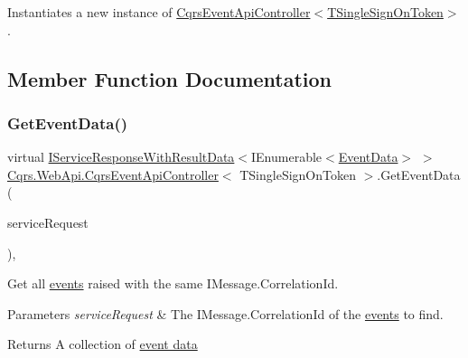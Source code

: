 Instantiates a new instance of \hyperlink{classCqrs_1_1WebApi_1_1CqrsEventApiController_a5f1162d692213363fdcaf898f439f7dd_a5f1162d692213363fdcaf898f439f7dd}{Cqrs\+Event\+Api\+Controller$<$\+T\+Single\+Sign\+On\+Token$>$}. 



\subsection{Member Function Documentation}
\mbox{\label{classCqrs_1_1WebApi_1_1CqrsEventApiController_aac0079ced115761a0ab605eaebe0801b_aac0079ced115761a0ab605eaebe0801b}} 
\subsubsection{\texorpdfstring{Get\+Event\+Data()}{GetEventData()}}
{\footnotesize\ttfamily virtual \hyperlink{interfaceCqrs_1_1Services_1_1IServiceResponseWithResultData}{I\+Service\+Response\+With\+Result\+Data}$<$I\+Enumerable$<$\hyperlink{classCqrs_1_1Events_1_1EventData}{Event\+Data}$>$ $>$ \hyperlink{classCqrs_1_1WebApi_1_1CqrsEventApiController}{Cqrs.\+Web\+Api.\+Cqrs\+Event\+Api\+Controller}$<$ T\+Single\+Sign\+On\+Token $>$.Get\+Event\+Data (\begin{DoxyParamCaption}\item[{\hyperlink{interfaceCqrs_1_1Services_1_1IServiceRequestWithData}{I\+Service\+Request\+With\+Data}$<$ T\+Single\+Sign\+On\+Token, Guid $>$}]{service\+Request }\end{DoxyParamCaption})\hspace{0.3cm}{\ttfamily [protected]}, {\ttfamily [virtual]}}



Get all \hyperlink{}{events} raised with the same I\+Message.\+Correlation\+Id. 


\begin{DoxyParams}{Parameters}
{\em service\+Request} & The I\+Message.\+Correlation\+Id of the \hyperlink{}{events} to find.\\
\hline
\end{DoxyParams}
\begin{DoxyReturn}{Returns}
A collection of \hyperlink{}{event data}
\end{DoxyReturn}
\mbox{\label{classCqrs_1_1WebApi_1_1CqrsEventApiController_a705b40b973640de14f7b8b7b4c6eb1fe_a705b40b973640de14f7b8b7b4c6eb1fe}} 
